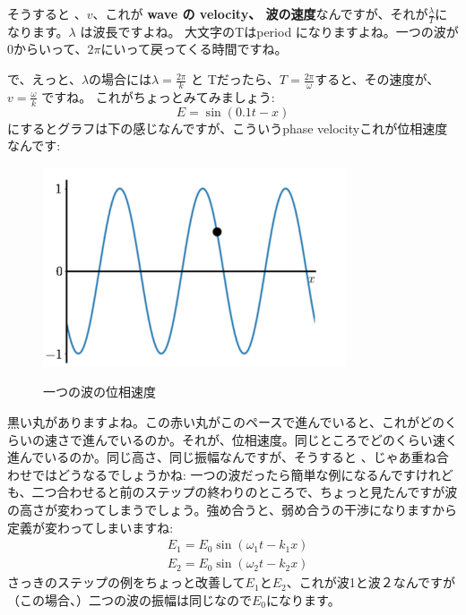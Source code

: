 そうすると 、$v$、これが\textbf{ wave の velocity、 波の速度}なんですが、それが$\frac{\lambda}{T}$になります。$\lambda$ は波長ですよね。 大文字のTはperiod になりますよね。一つの波が0からいって、$2\pi$にいって戻ってくる時間ですね。

で、えっと、$\lambda$の場合には$\lambda = \frac{2\pi}{k}$ と
Tだったら、$T = \frac{2\pi}{\omega}$すると、その速度が、$v =\frac{\omega}{k}$ ですね。
これがちょっとみてみましょう:
\begin{equation}
E=\sin (0.1 t-x)
\end{equation}
にするとグラフは下の感じなんですが、こういうphase velocityこれが位相速度なんです:
\begin{figure}[H]
   \centering
    \includegraphics[width=0.8\textwidth]{lesson6/black_dot.pdf}
    \label{fig: 1}
    \begin{center}
        \caption{一つの波の位相速度}
    \end{center}
\end{figure}
黒い丸がありますよね。この赤い丸がこのペースで進んでいると、これがどのくらいの速さで進んでいるのか。それが、位相速度。同じところでどのくらい速く進んでいるのか。同じ高さ、同じ振幅なんですが、そうすると 、じゃあ重ね合わせではどうなるでしょうかね:
一つの波だったら簡単な例になるんですけれども、二つ合わせると前のステップの終わりのところで、ちょっと見たんですが波の高さが変わってしまうでしょう。強め合うと、弱め合うの干渉になりますから定義が変わってしまいますね:
\begin{equation}
\begin{aligned}
&E_{1}=E_{0} \sin \left(\omega_{1} t-k_{1} x\right) \\
&E_{2}=E_{0} \sin \left(\omega_{2} t-k_{2} x\right)
\end{aligned}
\end{equation}
さっきのステップの例をちょっと改善して$E_1$と$E_2$、これが波1と波２なんですが（この場合、）二つの波の振幅は同じなので$E_0$になります。
